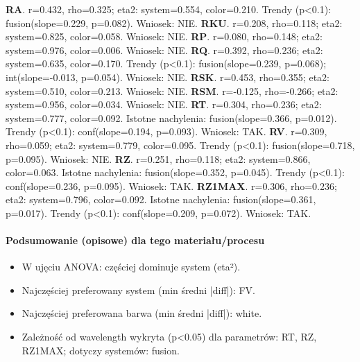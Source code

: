 \documentclass[
  10pt,
]{article}
\begin{document}
\textbf{RA}. r=0.432, rho=0.325; eta2: system=0.554, color=0.210. Trendy
(p\textless0.1): fusion(slope=0.229, p=0.082). Wniosek: NIE.
\textbf{RKU}. r=0.208, rho=0.118; eta2: system=0.825, color=0.058.
Wniosek: NIE. \textbf{RP}. r=0.080, rho=0.148; eta2: system=0.976,
color=0.006. Wniosek: NIE. \textbf{RQ}. r=0.392, rho=0.236; eta2:
system=0.635, color=0.170. Trendy (p\textless0.1): fusion(slope=0.239,
p=0.068); int(slope=-0.013, p=0.054). Wniosek: NIE. \textbf{RSK}.
r=0.453, rho=0.355; eta2: system=0.510, color=0.213. Wniosek: NIE.
\textbf{RSM}. r=-0.125, rho=-0.266; eta2: system=0.956, color=0.034.
Wniosek: NIE. \textbf{RT}. r=0.304, rho=0.236; eta2: system=0.777,
color=0.092. Istotne nachylenia: fusion(slope=0.366, p=0.012). Trendy
(p\textless0.1): conf(slope=0.194, p=0.093). Wniosek: TAK. \textbf{RV}.
r=0.309, rho=0.059; eta2: system=0.779, color=0.095. Trendy
(p\textless0.1): fusion(slope=0.718, p=0.095). Wniosek: NIE.
\textbf{RZ}. r=0.251, rho=0.118; eta2: system=0.866, color=0.063.
Istotne nachylenia: fusion(slope=0.352, p=0.045). Trendy
(p\textless0.1): conf(slope=0.236, p=0.095). Wniosek: TAK.
\textbf{RZ1MAX}. r=0.306, rho=0.236; eta2: system=0.796, color=0.092.
Istotne nachylenia: fusion(slope=0.361, p=0.017). Trendy
(p\textless0.1): conf(slope=0.209, p=0.072). Wniosek: TAK.

\paragraph{Podsumowanie (opisowe) dla tego materiału/procesu}
\begin{itemize}
\item W ujęciu ANOVA: częściej dominuje system (eta²).
\item Najczęściej preferowany system (min średni |diff|): FV.
\item Najczęściej preferowana barwa (min średni |diff|): white.
\item Zależność od wavelength wykryta (p<0.05) dla parametrów: RT, RZ, RZ1MAX; dotyczy systemów: fusion.
\end{itemize}
\end{document}
